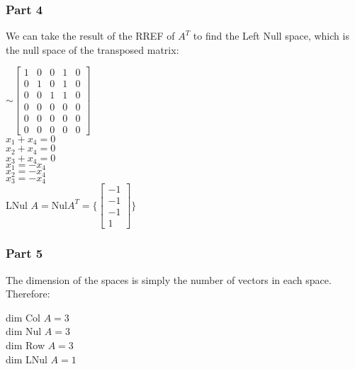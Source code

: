 \documentclass{report}
\begin{document}
\subsubsection*{Part 4}
We can take the result of the RREF of $A^T$ to find the Left Null space, which is the null space of the transposed matrix:
\begin{center}
    $\sim \begin{bmatrix} 
        1 & 0 & 0 & 1 & 0 \\ 
        0 & 1 & 0 & 1 & 0 \\
        0 & 0 & 1 & 1 & 0 \\ 
        0 & 0 & 0 & 0 & 0 \\ 
        0 & 0 & 0 & 0 & 0 \\
        0 & 0 & 0 & 0 & 0
    \end{bmatrix}
    $\\\vspace{3mm}
    $x_1 + x_4 = 0$\\
    $x_2 + x_4 = 0$\\
    $x_3  + x_4 = 0$\\\vspace{3mm}
    $x_1 = - x_4$\\
    $x_2 = - x_4$\\
    $x_3 = - x_4$\\\vspace{3mm}
    LNul $A=$Nul$A^T= \{
        \begin{bmatrix}
            -1 \\
            -1 \\
            -1 \\
            1
        \end{bmatrix}
    \}$
\end{center}
\subsubsection*{Part 5}
The dimension of the spaces is simply the number of vectors in each space. Therefore:
\begin{center}
    dim Col $A = 3$\\
    dim Nul $A = 3$\\
    dim Row $A = 3$\\
    dim LNul $A = 1$\\  
\end{center}

\clearpage
\end{document}
